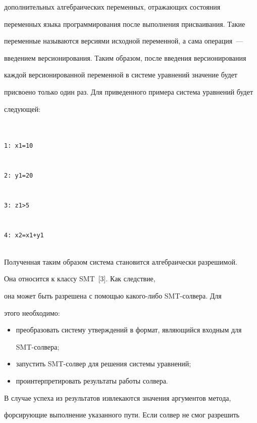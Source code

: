 дополнительных алгебраических переменных, отражающих состояния


переменных языка программирования после выполнения присваивания. Такие


переменные называются версиями исходной переменной, а сама операция~---


введением версионирования. Таким образом, после введения версионирования


каждой версионированной переменной в системе уравнений значение будет


присвоено только один раз. Для приведенного примера система уравнений будет


следующей:


     \begin{verbatim}


1: x1=10


2: y1=20


3: z1>5


4: x2=x1+y1


\end{verbatim}





     Полученная таким образом система становится алгебраически разрешимой.


Она относится к классу SMT~[3]. Как следствие,


она может быть разрешена с помощью ка\-ко\-го-ли\-бо SMT-сол\-ве\-ра. Для


этого необходимо:


     \begin{itemize}


\item преобразовать систему утверждений в формат, являющийся входным для


SMT-сол\-вера;


\item запустить SMT-солвер для решения системы уравнений;


\item проинтерпретировать результаты работы солвера.


\end{itemize}





     В случае успеха из результатов извлекаются значения аргументов метода,


форсирующие выполнение указанного пути. Если солвер не смог разрешить


